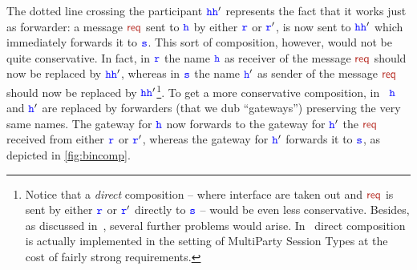 \noindent
The dotted line crossing the participant $\hh\hh'$ represents the fact that it works just as  forwarder:
a message $\msg[req]$ sent to $\hh$  by either $\ttr$ or $\ttr'$, is now sent to $\hh\hh'$
which immediately forwards it to $\tts$.
This sort of composition, however, would not be quite conservative.
In fact, in $\ttr$  the name $\hh$ as receiver of the message
  $\msg[req]$ should now be replaced by $\hh\hh'$, whereas  in $\tts$ the name $\hh'$ as sender of the message  $\msg[req]$ should now be replaced by $\hh\hh'$\footnote{
Notice that a {\em direct} composition -- where interface are taken out and  $\msg[req]$
is sent by either $\ttr$ or $\ttr'$ directly to $\tts$ -- would be even less conservative.
Besides, as discussed in~\cite{BdLH19}, several further problems would arise.
In~\cite{BDLT21} direct composition is actually implemented in the setting of MultiParty Session Types at the cost of fairly strong requirements.
}. 
To get a more conservative composition, in~\cite{BdLH19} $\hh$ and $\hh'$ are
replaced by forwarders (that we dub ``gateways'') preserving the very same names.
The gateway for $\hh$ now forwards to the gateway for $\hh'$ the $\msg[req]$ received from either 
$\ttr$ or $\ttr'$, whereas the gateway for $\hh'$ forwards it to $\tts$, as depicted in \cref{fig:bincomp}.  
\begin{figure}[h]
\end{figure}

